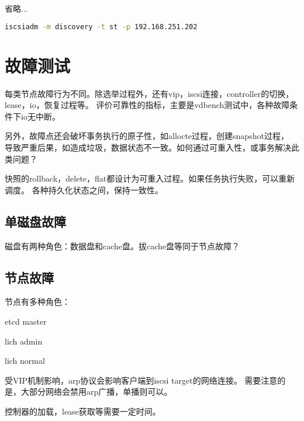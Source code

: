 省略...

\begin{lstlisting}[language=bash]
iscsiadm -m discovery -t st -p 192.168.251.202
\end{lstlisting}

\section{故障测试}

每类节点故障行为不同。除选举过程外，还有vip，iscsi连接，controller的切换，lease，io，恢复过程等。
评价可靠性的指标，主要是vdbench测试中，各种故障条件下io无中断。

另外，故障点还会破坏事务执行的原子性，如allocte过程，创建snapshot过程，
导致严重后果，如造成垃圾，数据状态不一致。如何通过可重入性，或事务解决此类问题？

快照的rollback，delete，flat都设计为可重入过程。如果任务执行失败，可以重新调度。
各种持久化状态之间，保持一致性。

\subsection{单磁盘故障}

磁盘有两种角色：数据盘和cache盘。拔cache盘等同于节点故障？

\subsection{节点故障}

节点有多种角色：
\begin{compactenum}
\item etcd master
\item lich admin
\item lich normal
\end{compactenum}

受VIP机制影响，arp协议会影响客户端到iscsi target的网络连接。
需要注意的是，大部分网络会禁用arp广播，单播则可以。

控制器的加载，lease获取等需要一定时间。
